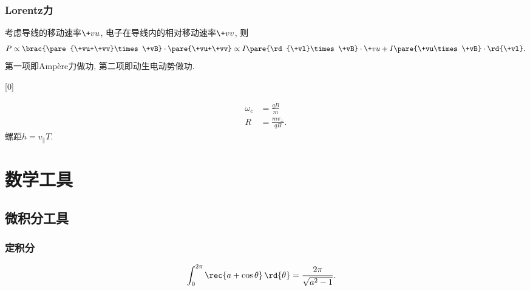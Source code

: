 \documentclass[hidelinks]{ctexart}
\begin{document}

\subsubsection{Lorentz力} %
\label{ssub:lorentz力}

\begin{remark}
    [磁力与Ampere力做功]考虑导线的移动速率$\+vu$, 电子在导线内的相对移动速率$\+vv$, 则
    \[ P\propto \brac{\pare{\+vu+\+vv}\times\+vB}\cdot\pare{\+vu+\+vv} \propto I\pare{\rd{\+vl}\times\+vB}\cdot\+vu + I\pare{\+vu\times\+vB}\cdot\rd{\+vl}. \]
    第一项即Amp\`ere力做功, 第二项即动生电动势做功.
\end{remark}
\leavevmode
{}[0]\vspace*{-\baselineskip}
\begin{finale}[right skip=5cm,]
    \begin{theorem}
        [均匀磁场中的带电粒子]
        \begin{align*}
            \omega_c &= \frac{qB}{m}\\
            R &= \frac{mv_\perp}{qB}.
        \end{align*}
        螺距$h=v_\parallel T$.
    \end{theorem}
\end{finale}
\leavevmode




\section{数学工具} %
\label{sec:数学工具}

\subsection{微积分工具} %
\label{sub:微积分工具}

\subsubsection{定积分} %
\label{ssub:定积分}

\begin{align}
    \label{eq:oint_rec_cos}
    \int_0^{2\pi} \rec{a+\cos\theta}\,\rd{\theta} &= \frac{2\pi}{\sqrt{a^2 - 1}}.
\end{align}



\end{document}
